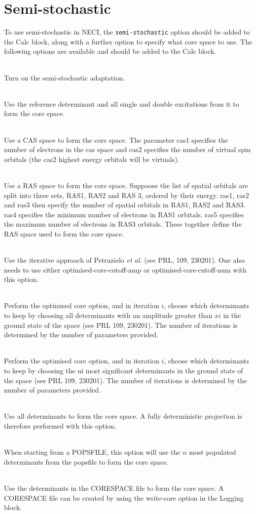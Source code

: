 \documentclass[a4paper,notitlepage]{scrreprt}
\newcommand\codeitem[1]{\needspace{1.5\baselineskip}\item[\textnormal{\ttfamily #1 \nopagebreak}] \hfill \\ \nopagebreak}
\let\code\lstinline
\begin{document}
\section{Semi-stochastic}

    To use semi-stochastic in NECI, the \code{semi-stochastic} option should
    be added to the Calc block, along with a further option to specify what
    core space to use. The following options are available and should be added
    to the Calc block.
    \begin{description}
		\codeitem{semi-stochastic}
            Turn on the semi-stochastic adaptation.
		\codeitem{doubles-core}
            Use the reference determinant and all single and double excitations
            from it to form the core space.
		\codeitem{cas-core cas1 cas2}
            Use a CAS space to form the core space. The parameter cas1 specifies
            the number of electrons in the cas space and cas2 specifies the
            number of virtual spin orbitals (the cas2 highest energy orbitals
            will be virtuals).
		\codeitem{ras-core ras1 ras2 ras3 ras4 ras5}
            Use a RAS space to form the core space. Suppoose the list of spatial
            orbitals are split into three sets, RAS1, RAS2 and RAS 3, ordered
            by their energy. ras1, ras2 and ras3 then specify the number of
            spatial orbitals in RAS1, RAS2 and RAS3. ras4 specifies the minimum
            number of electrons in RAS1 orbitals. ras5 specifies the maximum
            number of electrons in RAS3 orbitals. These together define the RAS
            space used to form the core space.
		\codeitem{optimised-core}
            Use the iterative approach of Petruzielo \emph{et al.} (see PRL,
            109, 230201). One also needs to use either optimised-core-cutoff-amp
            or optimised-core-cutoff-num with this option.
		\codeitem{optimised-core-cutoff-amp $x1$, $x2$, $x3$...}
            Perform the optimised core option, and in iteration $i$, choose
            which determinants to keep by choosing all determinants with an
            amplitude greater than $xi$ in the ground state of the space (see
            PRL 109, 230201). The number of iterations is determined by the
            number of parameters provided. 
		\codeitem{optimised-core-cutoff-num $n1$, $n2$, $n3$...}
            Perform the optimised core option, and in iteration $i$, choose
            which determinants to keep by choosing the ni most significant
            determinants in the ground state of the space (see PRL 109, 230201).
            The number of iterations is determined by the number of parameters
            provided. 
		\codeitem{fci-core}
            Use all determinants to form the core space. A fully deterministic
            projection is therefore performed with this option.
		\codeitem{pops-core $n$}
            When starting from a POPSFILE, this option will use the $n$ most
            populated determinants from the popsfile to form the core space.
		\codeitem{read-core}
            Use the determinants in the CORESPACE file to form the core space.
            A CORESPACE file can be created by using the write-core option in
            the Logging block.
    \end{description}
\end{document}
